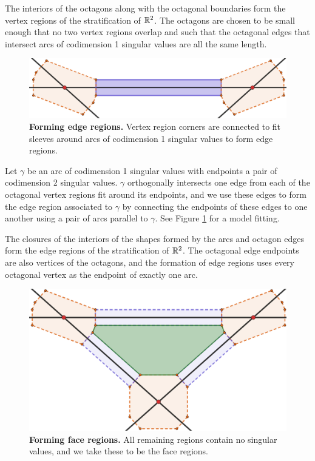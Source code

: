 The interiors of the octagons along with the octagonal boundaries form the vertex regions of the stratification of $\mathbb{R}^2$.
The octagons are chosen to be small enough that no two vertex regions overlap and such that the octagonal edges that intersect arcs of codimension 1 singular values are all the same length.

\begin{figure}[h!]
	\centering
	\includegraphics[width=\textwidth]{figures/edge-sleeve.png}
	\caption{
		\textbf{Forming edge regions.}
		Vertex region corners are connected to fit sleeves around arcs of codimension 1 singular values to form edge regions.  
	}
	\label{fig:edge-sleeve}
\end{figure}

Let $\gamma$ be an arc of codimension 1 singular values with endpoints a pair of codimension 2 singular values.
$\gamma$ orthogonally intersects one edge from each of the octagonal vertex regions fit around its endpoints, and we use these edges to form the edge region associated to $\gamma$ by connecting the endpoints of these edges to one another using a pair of arcs parallel to $\gamma$.
See Figure \ref{fig:edge-sleeve} for a model fitting.

The closures of the interiors of the shapes formed by the arcs and octagon edges form the edge regions of the stratification of $\mathbb{R}^2$.
The octagonal edge endpoints are also vertices of the octagons, and the formation of edge regions uses every octagonal vertex as the endpoint of exactly one arc.

\begin{figure}[h!]
	\centering
	\includegraphics[width=\textwidth]{figures/face-sleeve.png}
	\caption{
		\textbf{Forming face regions.}
		All remaining regions contain no singular values, and we take these to be the face regions.
	}
	\label{fig:face-sleeve}
\end{figure}

